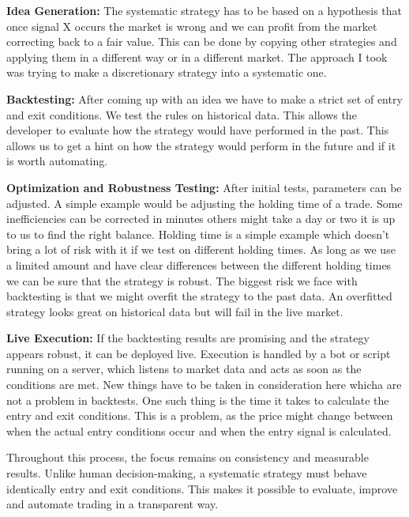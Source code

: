 \documentclass[12pt]{article}
\begin{document}
\textbf{Idea Generation:}
The systematic strategy has to be based on a hypothesis that once signal X occurs the market is wrong and we can profit from the market correcting back to a fair value. This can be done by copying other strategies and applying them in a different way or in a different market. The approach I took was trying to make a discretionary strategy into a systematic one.



\textbf{Backtesting:}
After coming up with an idea we have to make a strict set of entry and exit conditions. We test the rules on historical data. This allows the developer to evaluate how the strategy would have performed in the past. This allows us to get a hint on how the strategy would perform in the future and if it is worth automating. 

\textbf{Optimization and Robustness Testing:}
After initial tests, parameters can be adjusted. A simple example would be adjusting the holding time of a trade.  Some inefficiencies can be corrected in minutes others might take a day or two it is up to us to find the right balance. Holding time is a simple example which doesn't bring a lot of risk with it if we test on different holding times. As long as we use a limited amount and have clear differences between the different holding times we can be sure that the strategy is robust. The biggest risk we face with backtesting is that we might overfit the strategy to the past data. An overfitted strategy looks great on historical data but will fail in the live market.

\textbf{Live Execution:}
If the backtesting results are promising and the strategy appears robust, it can be deployed live. Execution is handled by a bot or script running on a server, which listens to market data and acts as soon as the conditions are met. New things have to be taken in consideration here whicha are not a problem in backtests. One such thing is the time it takes to calculate the entry and exit conditions. This is a problem, as the price might change between when the actual entry conditions occur and when the entry signal is calculated.

Throughout this process, the focus remains on consistency and measurable results. Unlike human decision-making, a systematic strategy must behave identically entry and exit conditions. This makes it possible to evaluate, improve and automate trading in a transparent way.
\end{document}
